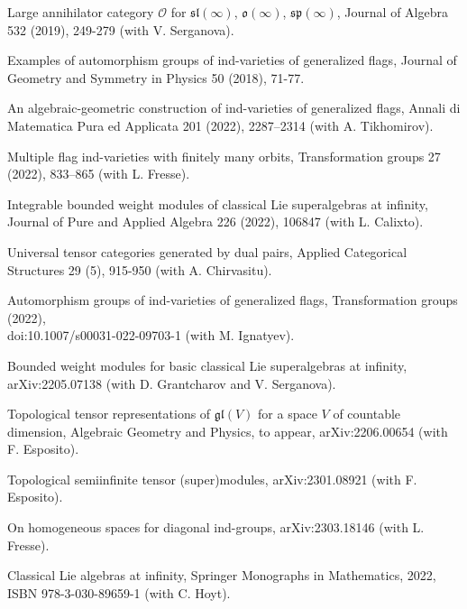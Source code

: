 \documentclass[11pt]{amsart}
\begin{document}
\myss \label{81.} Large annihilator category $\mathcal O$ for $\mathfrak{sl}(\infty)$, $\mathfrak{o}(\infty)$, $\mathfrak{sp}(\infty)$,  Journal of Algebra 532 (2019), 249-279 (with V. Serganova).

\myss \label{82.} Examples of automorphism groups of ind-varieties of generalized flags, Journal of Geometry and Symmetry in Physics 50 (2018), 71-77.

\myss \label{83.} An algebraic-geometric construction of ind-varieties of generalized
flags, Annali di Matematica Pura ed Applicata 201 (2022), 2287–2314 (with A. Tikhomirov).

\myss \label{84.} Multiple flag ind-varieties with finitely many orbits, Transformation groups 27 (2022), 833–865
(with L. Fresse).

\myss \label{85.} Integrable bounded weight modules of classical Lie superalgebras at infinity, Journal of Pure and Applied Algebra 226 (2022), 106847 (with L. Calixto).

\myss \label{86.}  Universal tensor categories generated by dual pairs, Applied Categorical Structures 29 (5), 915-950 (with A. Chirvasitu).

\myss \label{87.} Automorphism groups of ind-varieties of generalized flags, Transformation groups (2022), \\doi:10.1007/s00031-022-09703-1 (with M. Ignatyev).

\myss \label{88.} Bounded weight modules for basic classical Lie superalgebras at infinity, \\arXiv:2205.07138 (with D. Grantcharov and V. Serganova).

\myss \label{89.} Topological tensor representations of $ \mathfrak{gl}(V) $ for a space $ V $ of countable dimension, Algebraic Geometry and Physics, to appear, arXiv:2206.00654 (with F. Esposito).

\myss \label{90.} Topological semiinfinite tensor (super)modules, arXiv:2301.08921 (with F. Esposito).

\myss \label{91.} On homogeneous spaces for diagonal ind-groups, arXiv:2303.18146 (with L. Fresse).

\vspace*{1cm}
\medskip

\myss \label{1.} Classical Lie algebras at infinity, Springer Monographs in Mathematics, 2022, ISBN 978-3-030-89659-1 (with C. Hoyt).

\vspace*{1cm}
\medskip
\end{document}
